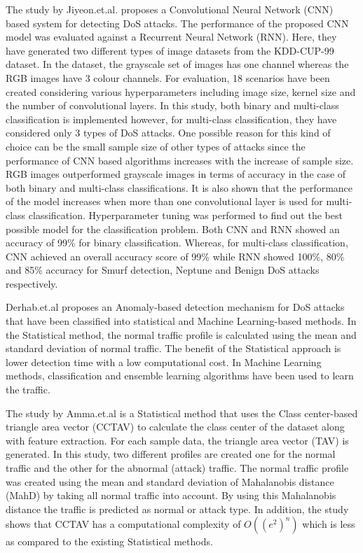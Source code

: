 \documentclass[conference]{IEEEtran}
\begin{document}
The study by Jiyeon.et.al.\cite{kim2020cnn} proposes a Convolutional Neural Network (CNN) based system for detecting DoS attacks. The performance of the proposed CNN model was evaluated against a Recurrent Neural Network (RNN). Here, they have generated two different types of image datasets from the KDD-CUP-99 dataset. In the dataset, the grayscale set of images has one channel whereas the RGB images have 3 colour channels. For evaluation, 18 scenarios have been created considering various hyperparameters including image size, kernel size and the number of convolutional layers. In this study, both binary and multi-class classification is implemented however, for multi-class classification, they have considered only 3 types of DoS attacks. One possible reason for this kind of choice can be the small sample size of other types of attacks since the performance of CNN based algorithms increases with the increase of sample size. RGB images outperformed grayscale images in terms of accuracy in the case of both binary and multi-class classifications. It is also shown that the performance of the model increases when more than one convolutional layer is used for multi-class classification. Hyperparameter tuning was performed to find out the best possible model for the classification problem. Both CNN and RNN showed an accuracy of 99\% for binary classification. Whereas, for multi-class classification, CNN achieved an overall accuracy score of 99\% while RNN showed 100\%, 80\% and 85\% accuracy for Smurf detection, Neptune and Benign DoS attacks respectively.

Derhab.et.al \cite{weller2014survey} proposes an Anomaly-based detection mechanism for DoS attacks that have been classified into statistical and Machine Learning-based methods. In the Statistical method, the normal traffic profile is calculated using the mean and standard deviation of normal traffic. The benefit of the Statistical approach is lower detection time with a low computational cost. In Machine Learning methods, classification and ensemble learning algorithms have been used to learn the traffic.

The study by Amma.et.al\cite{amma2020statistical} is a Statistical method that uses the Class center-based triangle area vector (CCTAV) to calculate the class center of the dataset along with feature extraction. For each sample data, the triangle area vector (TAV) is generated. In this study, two different profiles are created one for the normal traffic and the other for the abnormal (attack) traffic. The normal traffic profile was created using the mean and standard deviation of Mahalanobis distance (MahD) by taking all normal traffic into account. By using this  Mahalanobis distance the traffic is predicted as normal or attack type. In addition, the study shows that CCTAV has a computational complexity of $O((e^2)^n)$ which is less as compared to the existing Statistical methods.
\end{document}
